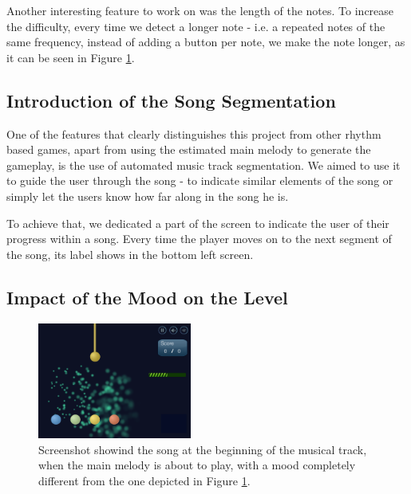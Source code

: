 Another interesting feature to work on was the length of the notes. To increase the difficulty, every time we detect a longer note - i.e. a repeated notes of the same frequency, instead of adding a button per note, we make the note longer, as it can be seen in Figure \ref{fig:notetypes}.

\vspace{10pt}

\subsection{Introduction of the Song Segmentation}

One of the features that clearly distinguishes this project from other rhythm based games, apart from using the estimated main melody to generate the gameplay, is the use of automated music track segmentation. We aimed to use it to guide the user through the song - to indicate similar elements of the song or simply let the users know how far along in the song he is. 

To achieve that, we dedicated a part of the screen to indicate the user of their progress within a song. Every time the player moves on to the next segment of the song, its label shows in the bottom left screen.

\vspace{10pt}
\newpage

\subsection{Impact of the Mood on the Level}

\begin{figure}
  \vspace{-10pt}
  \begin{center}
    \includegraphics[width=0.45\textwidth]{Figures/sparkChange}
  \end{center}
  \caption{Screenshot showind the song at the beginning of the musical track, when the main melody is about to play, with a mood completely different from the one depicted in Figure \ref{fig:notetypes}.}
\label{fig:notetypes}
\end{figure}



